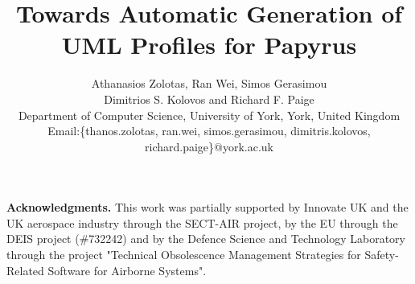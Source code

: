 \documentclass[global]{svjour}
\begin{document}
\title{Towards Automatic Generation of \\ UML Profiles for Papyrus}

\author{Athanasios Zolotas,  Ran Wei, Simos Gerasimou \\ Dimitrios S. Kolovos and Richard F. Paige \\
	Department of Computer Science, University of York, York, United Kingdom\\
		Email:\{thanos.zolotas, ran.wei, simos.gerasimou, dimitris.kolovos, richard.paige\}@york.ac.uk
	}


\maketitle{}










\noindent\textbf{Acknowledgments.}
This work was partially supported by Innovate UK and the UK aerospace industry 
through the SECT-AIR project, by the EU through the DEIS project (\#732242) and 
by the Defence Science and Technology Laboratory through the project "Technical 
Obsolescence Management Strategies for Safety-Related Software for Airborne 
Systems".

\clearpage


\end{document}
